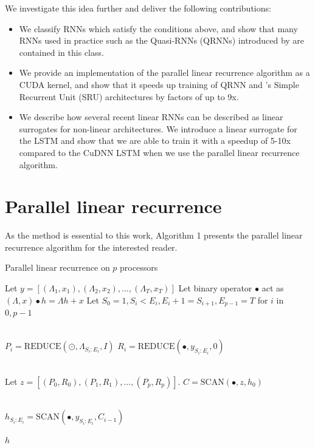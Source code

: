 \documentclass{article}
\providecommand{\scan}{\text{SCAN}}
\providecommand{\reduce}{\text{REDUCE}}
\begin{document}
We investigate this idea further and deliver the following contributions:
\begin{itemize}
\item{We classify RNNs which satisfy the conditions above, and show that many
    RNNs used in practice such as the Quasi-RNNs (QRNNs) introduced by
    \citet{bradbury2017quasi} are contained in this class.}
\item{We provide an implementation of the parallel linear recurrence algorithm
    as a CUDA kernel, and show that it speeds up training of QRNN and
    \citet{lei2017}'s Simple Recurrent Unit (SRU) architectures by factors of up
    to 9x.}
\item{We describe how several recent linear RNNs can be described as
    linear surrogates for non-linear architectures. We introduce a linear
    surrogate for the LSTM and show that we are able to train it
    with a speedup of 5-10x compared to the CuDNN LSTM when we use the
    parallel linear recurrence algorithm.}
\end{itemize}

\section{Parallel linear recurrence}
As the method is
essential to this work, Algorithm 1 presents the parallel linear recurrence
algorithm for the interested reader.
\begin{algorithm}
  \label{alg:plr}
\caption{Parallel linear recurrence on $p$ processors}
\begin{algorithmic}[1]
  \State Let $y = [(\Lambda_1, x_1), (\Lambda_2, x_2), ..., (\Lambda_T, x_T)]$
  \State Let binary operator $\bullet$ act as $(\Lambda, x) \bullet h = \Lambda h + x$
  \State Let $S_0=1, S_i < E_i, E_i + 1 = S_{i+1}, E_{p-1}=T$ for $i$ in $0,p-1$

  \\
    \State $P_i = \reduce(\odot, \Lambda_{S_i:E_i}, I)$
    \State $R_i = \reduce(\bullet, y_{S_i:E_i}, 0)$
  \EndParFor

  \\
  \State Let $z = [(P_0, R_0), (P_1, R_1), ..., (P_p, R_p)]$.
  \State $C = \scan(\bullet, z, h_0)$   

  \\
    \State $h_{S_i:E_i} = \scan(\bullet, y_{S_i:E_i}, C_{i-1})$
  \EndParFor

  \State \Return $h$
\end{algorithmic}
\end{algorithm}
\end{document}
